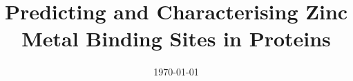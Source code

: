 \documentclass[a4paper, 11pt, oneside]{Style/UCLThesis}  %
\begin{document}
\frontmatter	  %

\title  {Predicting and Characterising Zinc Metal Binding Sites in Proteins}
\addresses  {\groupname\\\deptname\\\univname}  %
\date       {\today}
\subject    {}
\keywords   {}

\maketitle


\fancyhead{}  %
\rhead{\thepage}  %
\lhead{}  %

\pagestyle{fancy}  %
\end{document}
